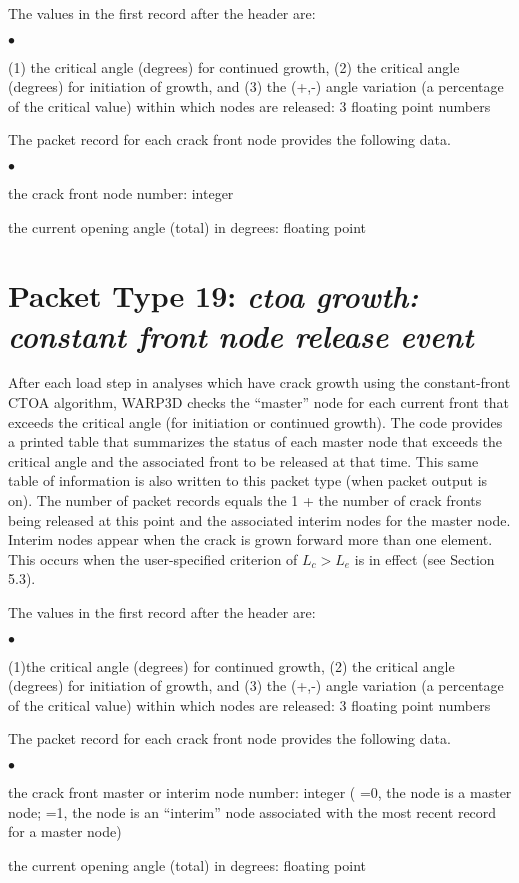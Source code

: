 \documentclass[10pt]{report}
\numberwithin{equation}{section}
\newcommand{\ti}{\emph}
\newcommand{\squishlist}{
 \begin{list}{$\bullet$}
  { \setlength{\itemsep}{0pt}
     \setlength{\parsep}{3pt}
     \setlength{\topsep}{3pt}
     \setlength{\partopsep}{0pt}
     \setlength{\leftmargin}{1.5em}
     \setlength{\labelwidth}{1em}
     \setlength{\labelsep}{0.5em} } }
\newcommand{\squishend}{
  \end{list}  }
\begin{document}
\noindent  The values in the first record after the header are:   
\squishlist
\item (1) the critical angle (degrees) for continued growth, (2)
the critical angle (degrees) for initiation of growth, and 
(3) the (+,-) angle variation (a percentage of the critical value) within which 
nodes are released: 3 floating point numbers
\squishend
\noindent  The packet record for each crack front node provides the following data.
\squishlist
\item the crack front node number:  integer
\item the current opening angle (total) in degrees:  floating point
\squishend

%
%
\section{Packet Type 19: \ti{ctoa growth: constant front node release    event}}
After each load step in analyses which have crack growth using the 
constant-front CTOA algorithm, WARP3D checks the ``master'' node for 
each current front that exceeds the critical angle (for initiation or continued 
growth). The code provides a printed table that summarizes the status of 
each master node that exceeds the critical angle and the associated front 
to be released at that time. This same table of information is also written 
to this packet type (when packet output is on). The number of packet records 
equals the 1 + the number of crack fronts being released at this point and 
the associated interim nodes for the master node. Interim nodes appear 
when the crack is grown forward more than one element. This occurs 
when the user-specified criterion of $L_c > L_e$ is in effect (see Section 5.3).

\noindent  The values in the first record after the header are:   
\squishlist
\item (1)the critical angle (degrees) for continued growth, (2) the 
critical angle (degrees) for initiation of growth, and (3) the (+,-) 
angle variation (a percentage of the critical value) within which 
nodes are released: 3 floating point numbers
\squishend
\noindent  The packet record for each crack front node provides the following data.
\squishlist
\item the crack front master or interim node number:  integer ( =0, the node is a 
master node; =1, the node is an ``interim'' node associated with the most 
recent record for a master node)
\item the current opening angle (total) in degrees:  floating point
\squishend
\end{document}
